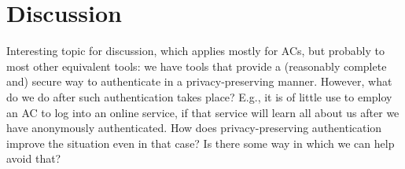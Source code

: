 \section{Discussion}
\label{sec:discussion}

Interesting topic for discussion, which applies mostly for ACs, but probably
to most other equivalent tools: we have tools that provide a (reasonably
complete and) secure way to authenticate in a privacy-preserving manner.
However, what do we do after such authentication takes place? E.g., it is of
little use to employ an AC to log into an online service, if that service
will learn all about us after we have anonymously authenticated. How does
privacy-preserving authentication improve the situation even in that case?
Is there some way in which we can help avoid that?

